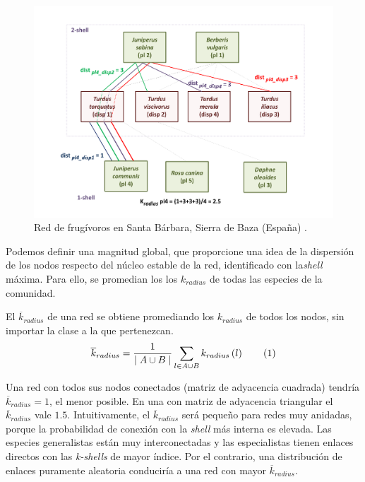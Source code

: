 \begin{figure}[h!]
\centering
\includegraphics[scale=0.55]{Figures/ESTATICA_SD_030_example_distances.pdf}
\caption {Red de frugívoros en Santa Bárbara, Sierra de Baza (España) \cite{jordano1993geographical}.}
\label{fig:ESTATICA_SD_030_example_distances}
\end{figure}

Podemos definir una magnitud global, que proporcione una idea de la dispersión de los nodos respecto del núcleo estable de la red, identificado con la\textit{shell} máxima. Para ello, se promedian los los $k_{radius}$ de todas las especies de la comunidad.

\begin{theo} 
El \textit{$\overline k_{radius}$} de una red se obtiene promediando los ${k}_{radius}$ de todos los nodos, sin importar la clase a la que pertenezcan.
\begin{align*}
\displaystyle
\overline {k}_{radius} = \frac{1}{\mid A \cup B \mid}\sum\limits_{l \in A \cup B} k_{radius}\left(l\right)
\stepcounter{equation}\tag{\theequation}\label{avgkradius}
\end{align*}
\label{ESTATICA_avgkradius}
\end{theo}

Una red con todos sus nodos conectados (matriz de adyacencia cuadrada) tendría $\overline {k}_{radius}=1$, el menor posible. En una con matriz de adyacencia triangular el $\overline {k}_{radius}$ vale $1.5$. Intuitivamente, el $\overline {k}_{radius}$ será pequeño para redes muy anidadas, porque la probabilidad de conexión con la \textit{shell} más interna es elevada. Las especies generalistas están muy interconectadas y las especialistas tienen enlaces directos con las \textit{k-shells} de mayor índice. Por el contrario, una distribución de enlaces puramente aleatoria conduciría a una red con mayor $\overline {k}_{radius}$.

